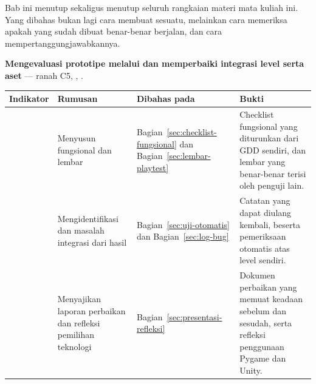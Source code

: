 \begin{subcpmkbox}
Bab ini menutup  sekaligus menutup seluruh rangkaian materi mata
kuliah ini. Yang dibahas bukan lagi cara membuat sesuatu, melainkan cara
memeriksa apakah yang sudah dibuat benar-benar berjalan, dan cara
mempertanggungjawabkannya.

\vspace{0.5em}
\textbf{ Mengevaluasi prototipe  melalui
 dan memperbaiki integrasi level serta aset} --- ranah C5,
, .

\vspace{0.5em}
{\setlength{\tabcolsep}{4pt}\footnotesize%
\begin{tabularx}{\textwidth}{@{}C{1.9cm} L{4.0cm} L{2.6cm} Y@{}}
\toprule
\headrow \textbf{Indikator} & \textbf{Rumusan} & \textbf{Dibahas pada} & \textbf{Bukti} \\
\midrule
{} & Menyusun  fungsional dan lembar  &
Bagian~\ref{sec:checklist-fungsional} dan Bagian~\ref{sec:lembar-playtest} &
Checklist fungsional yang diturunkan dari GDD sendiri, dan lembar
 yang benar-benar terisi oleh penguji lain. \\
\addlinespace
{} & Mengidentifikasi  dan masalah integrasi dari hasil
 &
Bagian~\ref{sec:uji-otomatis} dan Bagian~\ref{sec:log-bug} &
Catatan  yang dapat diulang kembali, beserta pemeriksaan otomatis
atas level sendiri. \\
\addlinespace
{} & Menyajikan laporan perbaikan dan refleksi pemilihan teknologi &
Bagian~\ref{sec:presentasi-refleksi} &
Dokumen perbaikan yang memuat keadaan sebelum dan sesudah, serta refleksi
penggunaan Pygame dan Unity. \\
\bottomrule
\end{tabularx}}
\end{subcpmkbox}
